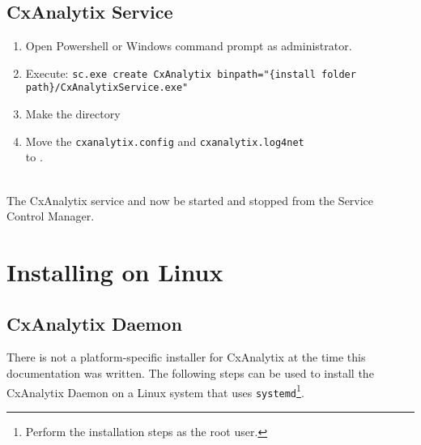 \subsection{CxAnalytix Service}
\begin{enumerate}
    \item Open Powershell or Windows command prompt as administrator.
    \item Execute: \texttt{sc.exe create CxAnalytix binpath="\{install folder path\}/CxAnalytixService.exe"}
    \item Make the directory \texttt{\windowsconfigpathbase}
    \item Move the \texttt{cxanalytix.config} and \texttt{cxanalytix.log4net} \\to \windowsconfigpath.
\end{enumerate}



\noindent\\The CxAnalytix service and now be started and stopped from the Service Control Manager.


\section{Installing on Linux}

\subsection{CxAnalytix Daemon}
There is not a platform-specific installer for CxAnalytix at the time this documentation was written. The following steps can 
be used to install the CxAnalytix Daemon on a Linux system that uses \verb|systemd|\footnote{Perform the installation steps as the root user.}.


